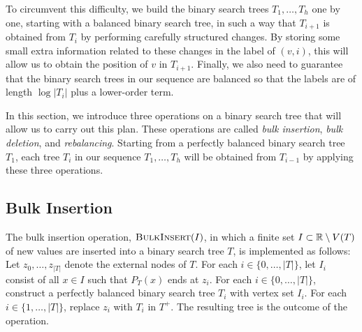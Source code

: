 \documentclass[kpfonts]{patmorin}
\let\le\leqslant
\begin{document}
To circumvent this difficulty, we build the binary search trees $T_1,\dots,T_h$ one by one, starting with a balanced binary search tree, in such a way that $T_{i+1}$ is obtained from $T_i$ by performing carefully structured changes. By storing some small extra information related to these changes in the label of $(v,i)$, this will allow us to obtain the position of $v$ in $T_{i+1}$.
Finally, we also need to guarantee that the binary search trees in our sequence are balanced so that the labels are of length $\log|T_i|$ plus a lower-order term.

In this section, we introduce three operations on a binary search tree that will allow us to carry out this plan.
These operations are called \emph{bulk insertion}, \emph{bulk deletion}, and \emph{rebalancing}.
Starting from a perfectly balanced binary search tree $T_1$, each tree $T_i$ in our sequence $T_1, \dots, T_h$ will be obtained from $T_{i-1}$ by applying these three operations.




\subsection{Bulk Insertion}

The bulk insertion operation, $\textsc{BulkInsert}(I)$,
in which a finite set $I\subset  \mathbb{R}\setminus V(T)$ of new values are inserted into a binary search tree $T$, is implemented as follows: Let $z_0,\dots,z_{|T|}$ denote the external nodes of $T$.  For each $i\in\{0,\dots,|T|\}$, let $I_i$ consist of all $x\in I$ such that $P_T(x)$ ends at $z_i$.
For each $i\in\{0,\dots,|T|\}$, construct a perfectly balanced binary search tree $T_i$ with vertex set $I_i$.
For each $i\in\{1,\dots,|T|\}$, replace $z_i$ with $T_i$ in $T^+$.
The resulting tree is the outcome of the operation.
\end{document}
